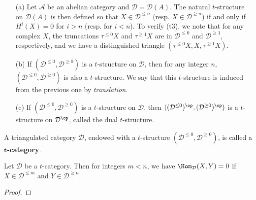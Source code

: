 \begin{example}
\mbox{}
\begin{enumerate}
    \item[(a)] Let $\mathcal{A}$ be an abelian category and $\mathcal{D}=\mathcal{D}(A)$. The natural $t$-structure on $\mathcal{D}(A)$ is then defined so that $X\in\mathcal{D}^{\leq n}$ (resp. $X\in\mathcal{D}^{\geq n}$) if and only if $H^i(X)=0$ for $i>n$ (resp. for $i<n$). To verify (t3), we note that for any complex $X$, the truncations $\tau^{\leq 0}X$ and $\tau^{\geq 1}X$ are in $\mathcal{D}^{\leq 0}$ and $\mathcal{D}^{\geq 1}$, respectively, and we have a distinguished triangle $(\tau^{\leq 0}X,X,\tau^{\geq 1}X)$. 
    \item[(b)] If $(\mathcal{D}^{\leq 0},\mathcal{D}^{\geq 0})$ is a $t$-structure on $\mathcal{D}$, then for any integer $n$, $(\mathcal{D}^{\leq 0},\mathcal{D}^{\geq 0})$ is also a $t$-structure. We say that this $t$-structure is induced from the previous one by \textit{translation}.
    \item[(c)] If $(\mathcal{D}^{\leq 0},\mathcal{D}^{\geq 0})$ is a $t$-structure on $\mathcal{D}$, then $((\mathcal{D}^{\leq 0})^{\op},(\mathcal{D}^{\geq 0})^{\op})$ is a $t$-structure on $\mathcal{D}^{\op}$, called the dual $t$-structure.
\end{enumerate}
\end{example}
A triangulated category $\mathcal{D}$, endowed with a $t$-structure $(\mathcal{D}^{\leq 0},\mathcal{D}^{\geq 0})$, is called a \textbf{$\bm{t}$-category}.

\begin{proposition}\label{triangle cat t-structure truncation Hom prop}
Let $\mathcal{D}$ be a $t$-category. Then for integers $m<n$, we have $\Hom_{\mathcal{D}}(X,Y)=0$ if $X\in\mathcal{D}^{\leq m}$ and $Y\in\mathcal{D}^{\geq n}$.
\end{proposition}
\begin{proof}

\end{proof}

